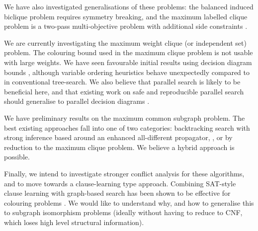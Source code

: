 \documentclass[letterpaper]{article}
\begin{document}
We have also investigated generalisations of these problems: the balanced induced biclique problem
\cite{cpaior/McCreeshP14} requires symmetry breaking, and the maximum labelled clique problem is a
two-pass multi-objective problem with additional side constraints \cite{ol/McCreeshP15}.

We are currently investigating the maximum weight clique (or independent set) problem. The colouring
bound used in the maximum clique problem is not usable with large weights. We have seen favourable
initial results using decision diagram bounds \cite{Bergman:2014}, although variable ordering
heuristics behave unexpectedly compared to in conventional tree-search. We also believe that
parallel search is likely to be beneficial here, and that existing work on safe and reproducible
parallel search should generalise to parallel decision diagrams \cite{BergmanCSSSH14}.

We have preliminary results on the maximum common subgraph problem. The best existing
approaches fall into one of two categories: backtracking search with strong inference based around
an enhanced all-different propagator, \cite{NdiayeS11}, or by reduction to the maximum clique
problem. We believe a hybrid approach is possible.

Finally, we intend to investigate stronger conflict analysis for these algorithms, and to move
towards a clause-learning type approach. Combining SAT-style clause learning with graph-based search
has been shown to be effective for colouring problems \cite{Zhou}. We would like to understand why,
and how to generalise this to subgraph isomorphism problems (ideally without having to reduce to
CNF, which loses high level structural information).



\end{document}
